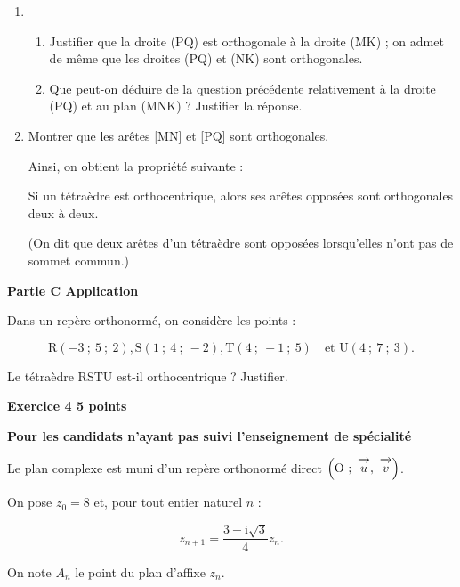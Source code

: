 \documentclass[10pt]{article}
\newcommand{\vect}[1]{\overrightarrow{\,\mathstrut#1\,}}
\def\Ouv{$\left(\text{O}~;~\vect{u},~\vect{v}\right)$}
\begin{document}
\begin{enumerate}
\item 
	\begin{enumerate}
		\item Justifier que la droite (PQ) est orthogonale à la droite (MK) ; on admet de même que les droites (PQ) et (NK) sont orthogonales.
		\item Que peut-on déduire de la question précédente relativement à la droite (PQ) et au plan (MNK) ? Justifier la réponse.
 	\end{enumerate}
\item Montrer que les arêtes [MN] et [PQ] sont orthogonales.
	
Ainsi, on obtient la propriété suivante :
	
Si un tétraèdre est orthocentrique, alors ses arêtes opposées sont orthogonales deux à deux.
	
(On dit que deux arêtes d'un tétraèdre sont \og opposées\fg{} lorsqu'elles n'ont pas de sommet commun.)
\end{enumerate}

\bigskip

\textbf{Partie C Application}

\medskip

Dans un repère orthonormé, on considère les points :

\[\text{R}(-3~;~5~;~2) ,\text{S}(1~;~4~;~-2) , \text{T}(4~;~-1~;~5)\quad  \text{et U}(4~;~7~;~3).\]

Le tétraèdre RSTU est-il orthocentrique ? Justifier.

\newpage

\textbf{Exercice 4 \hfill 5 points}

\textbf{Pour les candidats n'ayant pas suivi l'enseignement de spécialité}

\bigskip

Le plan complexe est muni d'un repère orthonormé direct \Ouv.

On pose $z_0 = 8$ et, pour tout entier naturel $n$ :

\[z_{n+1} = \dfrac{3 - \text{i}\sqrt{3}}{4}z_n.\]

On note $A_n$ le point du plan d'affixe $z_n$.

\medskip
\end{document}
